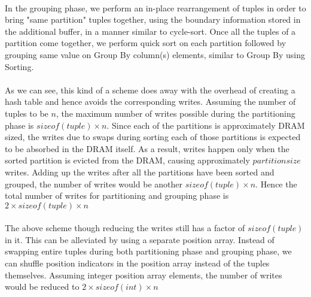 \paragraph{}
In the grouping phase, we perform an in-place rearrangement of tuples in order to bring "same partition" tuples together, using the boundary information stored in the additional buffer, in a manner similar to cycle-sort. Once all the tuples of a partition come together, we perform quick sort on each partition followed by grouping same value on Group By column(s) elements, similar to Group By using Sorting.

\paragraph{}
As we can see, this kind of a scheme does away with the overhead of creating a hash table and hence avoids the corresponding writes. Assuming the number of tuples to be $n$, the maximum number of writes possible during the partitioning phase is $sizeof(tuple) \times n$. Since each of the partitions is approximately DRAM sized, the writes due to swaps during sorting each of those partitions is expected to be absorbed in the DRAM itself. As a result, writes happen only when the sorted partition is evicted from the DRAM, causing approximately $partition size$ writes. Adding up the writes after all the partitions have been sorted and grouped, the number of writes would be another $sizeof(tuple) \times n$. Hence the total number of writes for partitioning and grouping phase is $2 \times sizeof(tuple) \times n$

\paragraph{}
The above scheme though reducing the writes still has a factor of $sizeof(tuple)$ in it. This can be alleviated by using a separate position array. Instead of swapping entire tuples during both partitioning phase and grouping phase, we can shuffle position indicators in the position array instead of the tuples themselves. Assuming integer position array elements, the number of writes would be reduced to $2 \times sizeof(int) \times n$